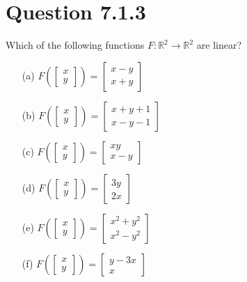 \documentclass[12pt]{article}
\begin{document}
\section*{Question 7.1.3}
Which of the following functions \( F: \mathbb{R}^2 \to \mathbb{R}^2 \) are linear?
\begin{itemize}
    \item[(a)] \( F\left(\begin{bmatrix} x \\ y \end{bmatrix}\right) = \begin{bmatrix} x - y \\ x + y \end{bmatrix} \)
    \item[(b)] \( F\left(\begin{bmatrix} x \\ y \end{bmatrix}\right) = \begin{bmatrix} x + y + 1 \\ x - y - 1 \end{bmatrix} \)
    \item[(c)] \( F\left(\begin{bmatrix} x \\ y \end{bmatrix}\right) = \begin{bmatrix} xy \\ x - y \end{bmatrix} \)
    \item[(d)] \( F\left(\begin{bmatrix} x \\ y \end{bmatrix}\right) = \begin{bmatrix} 3y \\ 2x \end{bmatrix} \)
    \item[(e)] \( F\left(\begin{bmatrix} x \\ y \end{bmatrix}\right) = \begin{bmatrix} x^2 + y^2 \\ x^2 - y^2 \end{bmatrix} \)
    \item[(f)] \( F\left(\begin{bmatrix} x \\ y \end{bmatrix}\right) = \begin{bmatrix} y - 3x \\ x \end{bmatrix} \)
\end{itemize}
\end{document}
